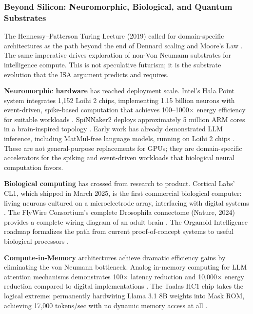 \subsubsection{Beyond Silicon: Neuromorphic, Biological, and Quantum Substrates}

The Hennessy--Patterson Turing Lecture (2019) called for domain-specific architectures as the path beyond the end of Dennard scaling and Moore's Law \cite{hennessy_patterson_2019}. The same imperative drives exploration of non-Von Neumann substrates for intelligence compute. This is not speculative futurism; it is the substrate evolution that the ISA argument predicts and requires.

\textbf{Neuromorphic hardware} has reached deployment scale. Intel's Hala Point system integrates 1,152 Loihi 2 chips, implementing 1.15 billion neurons with event-driven, spike-based computation that achieves 100--1000$\times$ energy efficiency for suitable workloads \cite{hala_point_2024}. SpiNNaker2 deploys approximately 5 million ARM cores in a brain-inspired topology \cite{spinnaker2_2024}. Early work has already demonstrated LLM inference, including MatMul-free language models, running on Loihi 2 chips \cite{abreu_2025_loihi2_llm}. These are not general-purpose replacements for GPUs; they are domain-specific accelerators for the spiking and event-driven workloads that biological neural computation favors.

\textbf{Biological computing} has crossed from research to product. Cortical Labs' CL1, which shipped in March 2025, is the first commercial biological computer: living neurons cultured on a microelectrode array, interfacing with digital systems \cite{cortical_2025_cl1}. The FlyWire Consortium's complete Drosophila connectome (Nature, 2024) provides a complete wiring diagram of an adult brain \cite{flywire_2024}. The Organoid Intelligence roadmap formalizes the path from current proof-of-concept systems to useful biological processors \cite{hartung_2023_oi}.

\textbf{Compute-in-Memory} architectures achieve dramatic efficiency gains by eliminating the von Neumann bottleneck. Analog in-memory computing for LLM attention mechanisms demonstrates 100$\times$ latency reduction and 10,000$\times$ energy reduction compared to digital implementations \cite{wolters2024computeinmemory}. The Taalas HC1 chip takes the logical extreme: permanently hardwiring Llama 3.1 8B weights into Mask ROM, achieving 17,000 tokens/sec with no dynamic memory access at all \cite{taalas_2026_hc1}.

